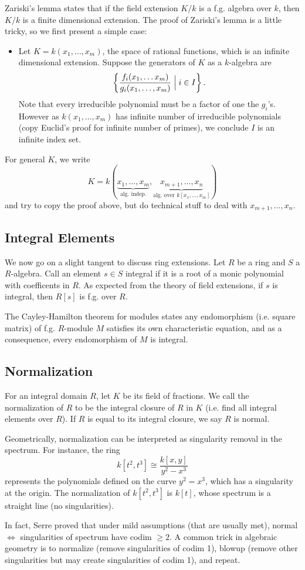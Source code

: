 Zariski's lemma states that if the field extension $K/k$ is a f.g. algebra over $k$, then $K/k$ is a finite dimensional extension. The proof of Zariski's lemma is a little tricky, so we first present a simple case:
\begin{itemize}
    \item Let $K = k(x_1, \dots, x_m)$, the space of rational functions, which is an infinite dimensional extension. Suppose the generators of $K$ as a $k$-algebra are
    \[
        \left\{\frac{f_i(x_1,\dots x_m)}{g_i(x_1, \dots, x_m)} \Bigm\vert i \in I \right\}.
    \]
    Note that every irreducible polynomial must be a factor of one the $g_i$'s. However as $k(x_1, \dots, x_m)$ has infinite number of irreducible polynomials (copy Euclid's proof for infinite number of primes), we conclude $I$ is an infinite index set.
\end{itemize}
For general $K$, we write
\[
    K = k(\underbrace{x_1, \dots, x_m}_{\text{alg. indep.}}, \underbrace{x_{m+1}, \dots, x_n}_{\text{alg. over } k[x_1, \dots, x_m]} )
\]
and try to copy the proof above, but do technical stuff to deal with $x_{m+1}, \dots, x_n$.

\subsection{Integral Elements}

We now go on a slight tangent to discuss ring extensions. Let $R$ be a ring and $S$ a $R$-algebra. Call an element $s \in S$ integral if it is a root of a monic polynomial with coefficents in $R$. As expected from the theory of field extensions, if $s$ is integral, then $R[s]$ is f.g. over $R$.

The Cayley-Hamilton theorem for modules states any endomorphism (i.e. square matrix) of f.g. $R$-module $M$ satisfies its own characteristic equation, and as a consequence, every endomorphism of $M$ is integral.

\subsection{Normalization}

For an integral domain $R$, let $K$ be its field of fractions. We call the normalization of $R$ to be the integral closure of $R$ in $K$ (i.e. find all integral elements over $R$). If $R$ is equal to its integral closure, we say $R$ is normal.

Geometrically, normalization can be interpreted as singularity removal in the spectrum. For instance, the ring
\[
    k[t^2, t^3] \cong \frac{k[x,y]}{y^2-x^3}
\]
represents the polynomials defined on the curve $y^2 = x^3$, which has a singularity at the origin. The normalization of $k[t^2, t^3]$ is $k[t]$, whose spectrum is a straight line (no singularities).

In fact, Serre proved that under mild assumptions (that are usually met), normal $\iff$ singularities of spectrum have codim $\ge 2$. A common trick in algebraic geometry is to normalize (remove singularities of codim 1), blowup (remove other singularities but may create singularities of codim 1), and repeat.

